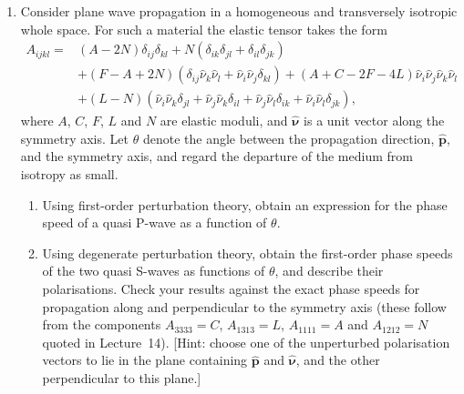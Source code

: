 \begin{enumerate}
\begin{enumerate}
    \begin{equation*}
        u_{i}(\mathbf{x},t)=\int_{0}^{t}\int_{M}\frac{\partial G_{ij}}{\partial x_{k}'}(\mathbf{x},t;\mathbf{x}',t')\overline{S}_{jk}(\mathbf{x}',t')\dd^{3}\mathbf{x}'\dd t'.
    \end{equation*}
    \hardp Using the result of part (a), show that the displacement generated by slip on a planar fault within an isotropic body is
    \begin{equation*}
        u_{i}(\mathbf{x},t)=\int_{0}^{t}\int_{\Sigma}\mu\left[\frac{\partial G_{ij}}{\partial x_{k}'}+\frac{\partial G_{ik}}{\partial x_{j}'}\right](\mathbf{x},t;\mathbf{x}',t')\,w_{j}(\mathbf{x}',t')\hat{n}_{k}(\mathbf{x}')\dd S'\dd t',
    \end{equation*}
    and comment on the physical content of this expression. (The normal $\hat{\mathbf{n}}$ is constant for a planar fault, but it has been written as a function of $\mathbf{x}'$ because the result holds unchanged for a general fault surface.)
\end{enumerate}

\item Consider plane wave propagation in a homogeneous and transversely isotropic whole space. For such a material the elastic tensor takes the form
\begin{align*}
A_{ijkl} = {}&(A-2N)\delta_{ij}\delta_{kl} + N(\delta_{ik}\delta_{jl} + \delta_{il}\delta_{jk}) \\
&+ (F-A+2N)(\delta_{ij}\hat{\nu}_{k}\hat{\nu}_{l} + \hat{\nu}_{i}\hat{\nu}_{j}\delta_{kl})
+ (A+C-2F-4L)\hat{\nu}_{i}\hat{\nu}_{j}\hat{\nu}_{k}\hat{\nu}_{l} \\
&+ (L-N)(\hat{\nu}_{i}\hat{\nu}_{k}\delta_{jl} + \hat{\nu}_{j}\hat{\nu}_{k}\delta_{il} + \hat{\nu}_{j}\hat{\nu}_{l}\delta_{ik} + \hat{\nu}_{i}\hat{\nu}_{l}\delta_{jk}),
\end{align*}
where $A$, $C$, $F$, $L$ and $N$ are elastic moduli, and $\hat{\bm{\nu}}$ is a unit vector along the symmetry axis. Let $\theta$ denote the angle between the propagation direction, $\hat{\mathbf{p}}$, and the symmetry axis, and regard the departure of the medium from isotropy as small.
\begin{enumerate}
    \item Using first-order perturbation theory, obtain an expression for the phase speed of a quasi P-wave as a function of $\theta$.
    \item Using degenerate perturbation theory, obtain the first-order phase speeds of the two quasi S-waves as functions of $\theta$, and describe their polarisations. Check your results against the exact phase speeds for propagation along and perpendicular to the symmetry axis (these follow from the components $A_{3333}=C$, $A_{1313}=L$, $A_{1111}=A$ and $A_{1212}=N$ quoted in Lecture~14). [Hint: choose one of the unperturbed polarisation vectors to lie in the plane containing $\hat{\mathbf{p}}$ and $\hat{\bm{\nu}}$, and the other perpendicular to this plane.]
\end{enumerate}


\end{enumerate}
